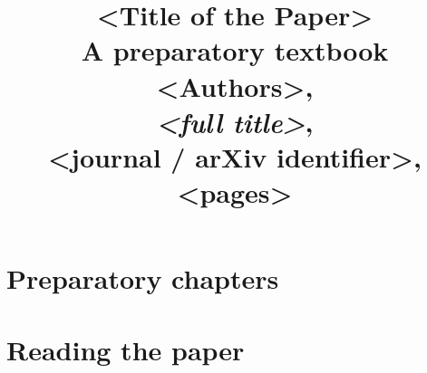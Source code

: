 \documentclass[11pt,oneside]{book}
\title{\textbf{<Title of the Paper>}\\[0.4em]
       \large A preparatory textbook\\[1.2em]
       \normalsize
       <Authors>,\\
       \emph{<full title>},\\
       <journal / arXiv identifier>, <pages>}
\author{}
\date{}
\begin{document}
\maketitle

\frontmatter
\tableofcontents

\mainmatter

% 

\part{Preparatory chapters}
% 
% 

\part{Reading the paper}
% 

\appendix
% 
% 

\backmatter
\nocite{*}


\end{document}
